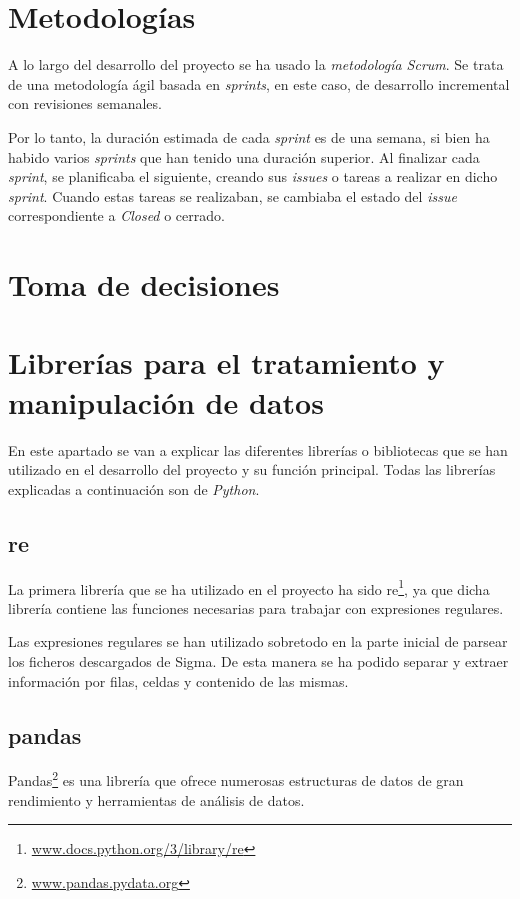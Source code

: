  
\section{Metodologías}\label{metodologias}

A lo largo del desarrollo del proyecto se ha usado la \emph{metodología Scrum}. Se trata de una metodología ágil basada en \emph{sprints}, en este caso, de desarrollo incremental con revisiones semanales.

Por lo tanto, la duración estimada de cada \emph{sprint} es de una semana, si bien ha habido varios \emph{sprints} que han tenido una duración superior. Al finalizar cada \emph{sprint}, se planificaba el siguiente, creando sus \emph{issues} o tareas a realizar en dicho \emph{sprint}. Cuando estas tareas se realizaban, se cambiaba el estado del \emph{issue} correspondiente a \emph{Closed} o cerrado.  


\section{Toma de decisiones}\label{toma_de_decisiones}


\section{Librerías para el tratamiento y manipulación de datos}\label{librerias}
En este apartado se van a explicar las diferentes librerías o bibliotecas que se han utilizado en el desarrollo del proyecto y su función principal. Todas las librerías explicadas a continuación son de \emph{Python}.

\subsection{re}
La primera librería que se ha utilizado en el proyecto ha sido re\footnote{\href {https://docs.python.org/3/library/re.html}{www.docs.python.org/3/library/re}}, ya que dicha librería contiene las funciones necesarias para trabajar con expresiones regulares.

Las expresiones regulares se han utilizado sobretodo en la parte inicial de parsear los ficheros descargados de Sigma. De esta manera se ha podido separar y extraer información por filas, celdas y contenido de las mismas.


\subsection{pandas}
Pandas\footnote{\href{https://pandas.pydata.org/}{www.pandas.pydata.org}} es una librería que ofrece numerosas estructuras de datos de gran rendimiento y herramientas de análisis de datos.

